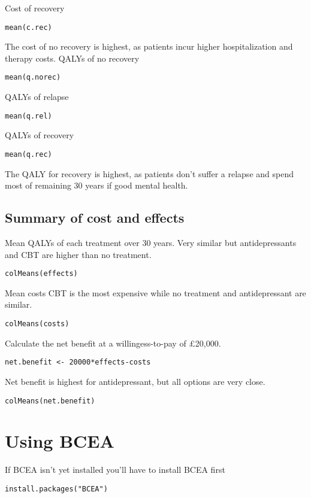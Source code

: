 \documentclass[a4paper,twoside,openany]{../svmonoBUGS}\usepackage[]{graphicx}\usepackage[]{color}
\begin{document}
Cost of recovery
\begin{verbatim}
mean(c.rec)
\end{verbatim}

The cost of no recovery is highest, as patients incur higher hospitalization and therapy costs.
QALYs of no recovery
\begin{verbatim}
mean(q.norec)
\end{verbatim}

QALYs of relapse
\begin{verbatim}
mean(q.rel)
\end{verbatim}

QALYs of recovery
\begin{verbatim}
mean(q.rec)
\end{verbatim}

The QALY for recovery is highest, as patients don't suffer a relapse and spend most of remaining 30 years if good mental health.

\subsection{Summary of cost and effects}

Mean QALYs of each treatment over 30 years.
Very similar but antidepressants and CBT are higher than no treatment.
\begin{verbatim}
colMeans(effects)
\end{verbatim}

Mean costs
CBT is the most expensive while no treatment and antidepressant are similar.
\begin{verbatim}
colMeans(costs)
\end{verbatim}

Calculate the net benefit at a willingess-to-pay of £20,000.
\begin{verbatim}
net.benefit <- 20000*effects-costs
\end{verbatim}

Net benefit is highest for antidepressant, but all options are very close.
\begin{verbatim}
colMeans(net.benefit)
\end{verbatim}

%
\section{Using BCEA}

If BCEA isn't yet installed you'll have to install BCEA first
\begin{verbatim}
install.packages("BCEA")
\end{verbatim}
\end{document}

